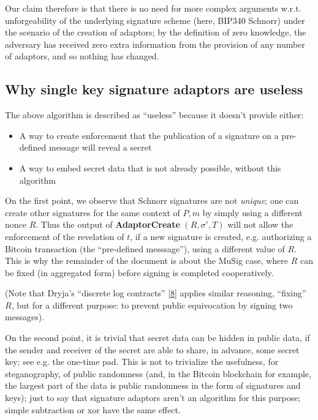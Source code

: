 \documentclass[10pt,a4paper]{article}
\begin{document}
Our claim therefore is that there is no need for more complex arguments w.r.t. unforgeability of the underlying signature scheme (here, BIP340 Schnorr) under the scenario of the creation of adaptors; by the definition of zero knowledge, the adversary has received zero extra information from the provision of any number of adaptors, and so nothing has changed.

\subsection{Why single key signature adaptors are useless}

The above algorithm is described as ``useless'' because it doesn't provide either:

\begin{itemize}
\item A way to create enforcement that the publication of a signature on a pre-defined message will reveal a secret
\item A way to embed secret data that is not already possible, without this algorithm
\end{itemize}

On the first point, we observe that Schnorr signatures are not \emph{unique}; one can create other signatures for the same context of $P, m$ by simply using a different nonce $R$. Thus the output of \textbf{AdaptorCreate} $(R, \sigma', T)$ will not allow the enforcement of the revelation of $t$, if a new signature is created, e.g. authorizing a Bitcoin transaction (the ``pre-defined messsage''), using a different value of $R$. This is why the remainder of the document is about the MuSig case, where $R$ can be fixed (in aggregated form) before signing is completed cooperatively.

\vspace{5 pt}

(Note that Dryja's ``discrete log contracts'' {[}\protect\hyperlink{anchor-8}{8}{]} applies similar reasoning, ``fixing'' $R$, but for a different purpose: to prevent public equivocation by signing two messages).

\vspace{5 pt}

On the second point, it is trivial that secret data can be hidden in public data, if the sender and receiver of the secret are able to share, in advance, some secret key; see e.g. the one-time pad. This is not to trivialize the usefulness, for steganography, of public randomness (and, in the Bitcoin blockchain for example, the largest part of the data is public randomness in the form of signatures and keys); just to say that signature adaptors aren't an algorithm for this purpose; simple subtraction or xor have the same effect.
\end{document}
